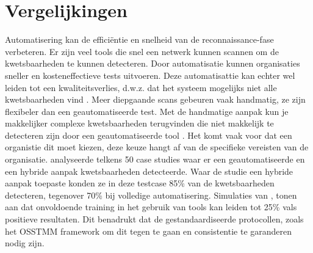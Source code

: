 \section{Vergelijkingen}
Automatisering kan de efficiëntie en snelheid van de reconnaissance-fase verbeteren. Er zijn veel tools die snel een netwerk kunnen scannen om de kwetsbaarheden te kunnen detecteren. 
Door automatisatie kunnen organisaties sneller en kosteneffectieve tests uitvoeren. Deze automatisattie kan echter wel leiden tot een kwaliteitsverlies, d.w.z. dat het systeem mogelijks niet alle kwetsbaarheden vind \autocite{peris}. 
Meer diepgaande scans gebeuren vaak handmatig, ze zijn flexibeler dan een geautomatiseerde test. Met de handmatige aanpak kun je makkelijker complexe kwetsbaarheden terugvinden die niet makkelijk te detecteren zijn door een geautomatiseerde tool \autocite{Altulaihan2023}. 
Het komt vaak voor dat een organistie dit moet kiezen,
deze keuze hangt af van de specifieke vereisten van de organisatie. \textcite{Monero2025} analyseerde telkens 50 case studies waar er een geautomatiseerde en een hybride aanpak kwetsbaarheden detecteerde. Waar de studie een hybride aanpak toepaste konden ze in deze testcase 85\% van de kwetsbaarheden detecteren, tegenover 70\% bij volledige automatisering.
Simulaties van \textcite{Whitaker2005}, tonen aan dat onvoldoende training in het gebruik van tools kan leiden tot 25\% vals positieve resultaten.
Dit benadrukt dat de gestandaardiseerde protocollen, zoals het OSSTMM framework om dit tegen te gaan en consistentie te garanderen nodig zijn.

